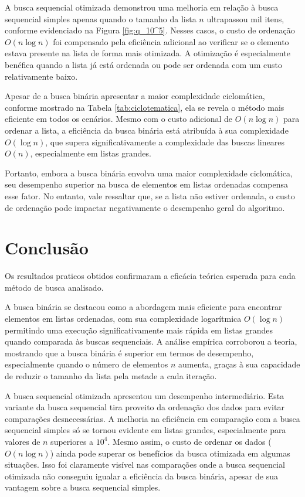 \documentclass[12pt]{article}
\begin{document}
    A busca sequencial otimizada demonstrou uma melhoria em relação à busca sequencial simples apenas quando o tamanho da lista \(n\) ultrapassou mil itens, conforme evidenciado na Figura \ref{fig:q_10^5}. Nesses casos, o custo de ordenação \(O(n \log n)\) foi compensado pela eficiência adicional ao verificar se o elemento estava presente na lista de forma mais otimizada. A otimização é especialmente benéfica quando a lista já está ordenada ou pode ser ordenada com um custo relativamente baixo.
    
    Apesar de a busca binária apresentar a maior complexidade ciclomática, conforme mostrado na Tabela \ref{tab:ciclotematica}, ela se revela o método mais eficiente em todos os cenários. Mesmo com o custo adicional de \(O(n \log n)\) para ordenar a lista, a eficiência da busca binária está atribuída à sua complexidade \(O(\log n)\), que supera significativamente a complexidade das buscas lineares \(O(n)\), especialmente em listas grandes.
    
    Portanto, embora a busca binária envolva uma maior complexidade ciclomática, seu desempenho superior na busca de elementos em listas ordenadas compensa esse fator. No entanto, vale ressaltar que, se a lista não estiver ordenada, o custo de ordenação pode impactar negativamente o desempenho geral do algoritmo.



\section{Conclusão} 

    Os resultados praticos obtidos confirmaram a eficácia teórica esperada para cada método de busca analisado.
    
    A busca binária se destacou como a abordagem mais eficiente para encontrar elementos em listas ordenadas, com sua complexidade logarítmica \(O(\log n)\) permitindo uma execução significativamente mais rápida em listas grandes quando comparada às buscas sequenciais. A análise empírica corroborou a teoria, mostrando que a busca binária é superior em termos de desempenho, especialmente quando o número de elementos \(n\) aumenta, graças à sua capacidade de reduzir o tamanho da lista pela metade a cada iteração.

    A busca sequencial otimizada apresentou um desempenho intermediário. Esta variante da busca sequencial tira proveito da ordenação dos dados para evitar comparações desnecessárias. A melhoria na eficiência em comparação com a busca sequencial simples só se tornou evidente em listas grandes, especialmente para valores de \(n\) superiores a \(10^4\). Mesmo assim, o custo de ordenar os dados (\(O(n \log n)\)) ainda pode superar os benefícios da busca otimizada em algumas situações. Isso foi claramente visível nas comparações onde a busca sequencial otimizada não conseguiu igualar a eficiência da busca binária, apesar de sua vantagem sobre a busca sequencial simples.
    
\end{document}
